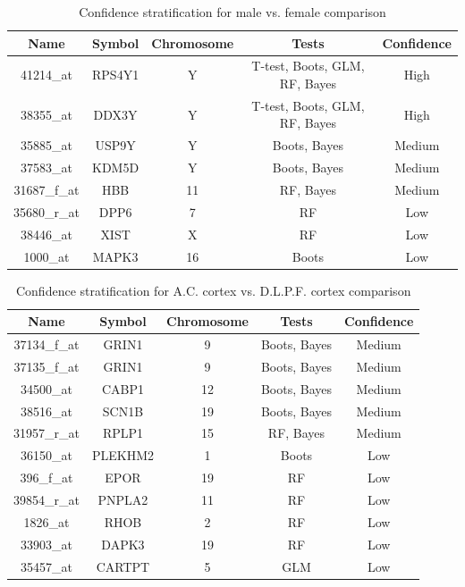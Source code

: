 \documentclass[12pt]{article}
\begin{document}
\begin{table}[h!]
\centering
\begin{tabular}{|c|c|c|c|c|}
\hline
\textbf{Name} & \textbf{Symbol} & \textbf{Chromosome} & \textbf{Tests} & \textbf{Confidence} \\
\hline
41214\_at & RPS4Y1 & Y & T-test, Boots, GLM, RF, Bayes & High \\
38355\_at & DDX3Y & Y & T-test, Boots, GLM, RF, Bayes & High \\
35885\_at & USP9Y & Y & Boots, Bayes & Medium \\
37583\_at & KDM5D & Y & Boots, Bayes & Medium \\
31687\_f\_at & HBB & 11 & RF, Bayes& Medium \\
35680\_r\_at & DPP6 & 7 & RF & Low \\
38446\_at & XIST & X & RF & Low \\
1000\_at & MAPK3 & 16 & Boots & Low \\
\hline
\end{tabular}
\caption{Confidence stratification for male vs. female comparison}
\end{table}

\begin{table}[h!]
\centering
\begin{tabular}{|c|c|c|c|c|}
\hline
\textbf{Name} & \textbf{Symbol} & \textbf{Chromosome} & \textbf{Tests} & \textbf{Confidence} \\
\hline
37134\_f\_at & GRIN1 & 9 & Boots, Bayes & Medium \\
37135\_f\_at & GRIN1 & 9 & Boots, Bayes & Medium \\
34500\_at & CABP1 & 12 & Boots, Bayes & Medium \\
38516\_at & SCN1B & 19 & Boots, Bayes & Medium \\
31957\_r\_at & RPLP1 & 15 & RF, Bayes & Medium \\
36150\_at & PLEKHM2 & 1 & Boots & Low \\
396\_f\_at & EPOR & 19 & RF & Low \\
39854\_r\_at & PNPLA2 & 11 & RF & Low \\
1826\_at & RHOB & 2 & RF & Low \\
33903\_at & DAPK3 & 19 & RF & Low \\
35457\_at & CARTPT & 5 & GLM & Low \\
\hline
\end{tabular}
\caption{Confidence stratification for A.C. cortex vs. D.L.P.F. cortex comparison}
\end{table}
\end{document}
